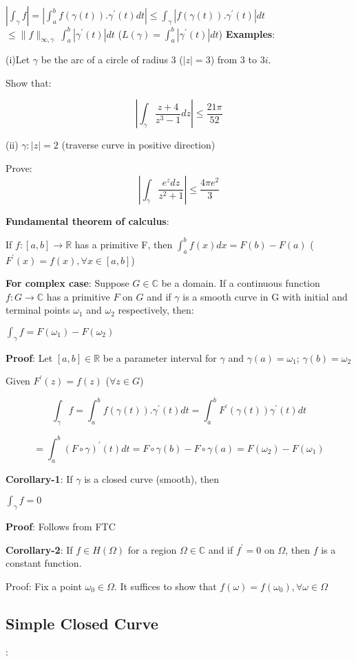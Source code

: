 \documentclass{article}
\begin{document}
\begin{flushleft}
$|\int_{\gamma}^{} f|= |\int_{a}^{b} f(\gamma(t)).\gamma^{'}(t) dt| \leq \int_{\gamma}^{} |f(\gamma(t)).\gamma^{'}(t)| dt$
$\leq \|f\|_{\infty,\gamma}\:  \int_{a}^{b} |\gamma^{'}(t)| dt$   \: ($L(\gamma)=\int_{a}^{b} |\gamma^{'}(t)| dt$)
\textbf{Examples}: 

(i)Let $\gamma$ be the arc of a circle of radius 3 ($|z|=3$) from $3$ to $3i$.

Show that:

$$|\int_{\gamma}^{} \frac{z+4}{z^3-1} dz| \leq \frac{21\pi}{52}$$

(ii) $\gamma: |z|=2$  (traverse curve in positive direction)

Prove: $$|\int_{\gamma}^{} \frac{e^z dz}{z^2+1} | \leq \frac{4\pi e^2}{3}$$

\textbf{Fundamental theorem of calculus}: 

If $f:[a,b]\rightarrow \mathds{R}$ has a primitive F, then $\int_{a}^{b} f(x) dx =F(b)-F(a)$ \: ($F^{'}(x)=f(x), \forall x\in [a,b]$)

\textbf{For complex case}: Suppose $G\in \mathds{C}$ be a domain. If a continuous function $f:G\rightarrow \mathds{C}$ has a primitive $F$ on $G$ and if $\gamma$ is a smooth curve in G with initial and terminal points $\omega_1$ and $\omega_2$ respectively, then:

$\int_{\gamma}^{} f = F(\omega_1) - F(\omega_2)$

\textbf{Proof}: Let $[a,b]\in \mathds{R}$ be a parameter interval for $\gamma$ and $\gamma(a)=\omega_1$; $\gamma(b)=\omega_2$

Given $F^{'}(z)=f(z)$   ($\forall z \in G$)

$$\int_{\gamma}^{} f = \int_{a}^{b} f(\gamma(t)).\gamma^{'}(t) dt = \int_{a}^{b} F^{'}(\gamma(t))\gamma^{'}(t) dt$$

$$= \int_{a}^{b} (F \circ \gamma)^{'}(t) dt = F \circ \gamma(b)-F \circ \gamma(a)= F(\omega_2)-F(\omega_1)$$

\textbf{Corollary-1}: If $\gamma$ is a closed curve (smooth), then

$\int_{\gamma}^{} f =0$ 

\textbf{Proof}: Follows from FTC

\textbf{Corollary-2}: If $f\in H(\Omega)$ for a region $\Omega\in \mathds{C}$ and if $f^{'}=0$ on $\Omega$, then $f$ is a constant function.

Proof: Fix a point $\omega_0\in \Omega$. It suffices to show that $f(\omega)=f(\omega_0), \forall \omega \in \Omega$

\subsection{\textbf{Simple Closed Curve}}: 


\end{flushleft}
\end{document}
